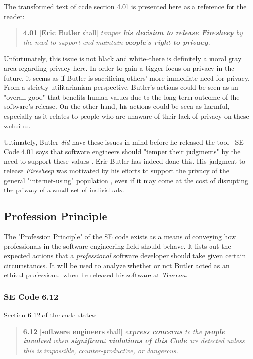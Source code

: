 \documentclass[11pt]{article}
\begin{document}
\begin{multicols}{2}
The transformed text of code section 4.01 is presented here as a reference for the reader:

\begin{quote}
\textbf{4.01} [\textbf{Eric Butler} shall] \emph{temper \textbf{his decision to release Firesheep} by the need to support and maintain \textbf{people's right to privacy}.} \cite{se_code}
\end{quote}

Unfortunately, this issue is not black and white--there is definitely a moral gray area regarding privacy here. In order to gain a bigger focus on privacy in the future, it seems as if Butler is sacrificing others' more immediate need for privacy. From a strictly utilitarianism perspective, Butler's actions could be seen as an "overall good" that benefits human values due to the long-term outcome of the software's release. On the other hand, his actions could be seen as harmful, especially as it relates to people who are unaware of their lack of privacy on these websites.

Ultimately, Butler \emph{did} have these issues in mind before he released the tool \cite{codebutler_main}. SE Code 4.01 says that software engineers should "temper their judgments" by the need to support these values \cite{se_code}. Eric Butler has indeed done this. His judgment to release \emph{Firesheep} was motivated by his efforts to support the privacy of the general "internet-using" population \cite{codebutler_main}, even if it may come at the cost of disrupting the privacy of a small set of individuals.

\subsection{Profession Principle}
The "Profession Principle" of the SE code exists as a means of conveying how professionals in the software engineering field should behave. It lists out the expected actions that a \emph{professional} software developer should take given certain circumstances. It will be used to analyze whether or not Butler acted as an ethical professional when he released his software at \emph{Toorcon}.

\subsubsection{SE Code 6.12}
Section 6.12 of the code states:
\begin{quote}
  \textbf{6.12} [\textbf{software engineers} shall] \emph{\textbf{express concerns} to the \textbf{people involved} when \textbf{significant violations of this Code} are detected unless this is impossible, counter-productive, or dangerous.} \cite{se_code}
\end{quote}


\end{multicols}
\end{document}
